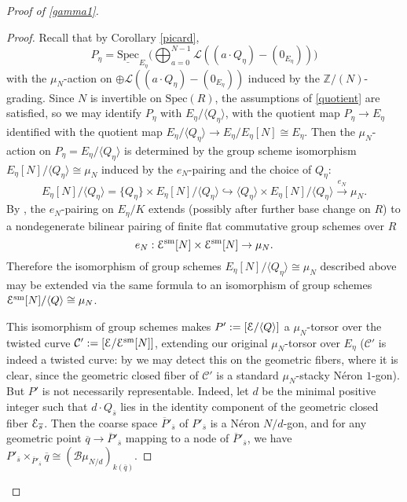 \documentclass[11pt]{amsart}
\theoremstyle{definition}
\begin{document}
\begin{proof}[Proof of \ref{gamma1}]
\begin{proof}
Recall that by Corollary \ref{picard}, 
\begin{displaymath}
P_\eta = \underline{\mathrm{Spec}}_{E_\eta} \big( \bigoplus_{a=0}^{N-1} {\mathcal{L}}((a\cdot Q_\eta) - (0_{E_\eta}))\big)
\end{displaymath}
with the $\mu_N$-action on $\oplus {\mathcal{L}}((a\cdot Q_\eta) - (0_{E_\eta}))$ induced by the $\mathbb{Z}/(N)$-grading. Since $N$ is invertible on $\mathrm{Spec}(R)$, the assumptions of \ref{quotient} are satisfied, so we may identify $P_\eta$ with $E_\eta/\langle Q_\eta \rangle$, with the quotient map $P_\eta \rightarrow E_\eta$ identified with the quotient map $E_\eta/\langle Q_\eta \rangle \rightarrow E_\eta/E_\eta[N] \cong E_\eta$. Then the $\mu_N$-action on $P_\eta = E_\eta/\langle Q_\eta \rangle$ is determined by the group scheme isomorphism $E_\eta[N]/\langle Q_\eta \rangle \cong \mu_N$ induced by the $e_N$-pairing and the choice of $Q_\eta$:
\begin{displaymath}
E_\eta[N]/\langle Q_\eta \rangle = \{Q_\eta\} \times E_\eta[N]/\langle Q_\eta \rangle \hookrightarrow \langle Q_\eta \rangle \times E_\eta[N]/\langle Q_\eta \rangle \stackrel{e_N}{\rightarrow} \mu_N.
\end{displaymath}
By \cite[Theorem 4.1.1]{C}, the $e_N$-pairing on $E_\eta/K$ extends (possibly after further base change on $R$) to a nondegenerate bilinear pairing of finite flat commutative group schemes over $R$ 
\begin{displaymath}
e_N: {\mathbf{\EuScript{E}}}^{\mathrm{sm}}[N] \times {\mathbf{\EuScript{E}}}^{\mathrm{sm}}[N] \rightarrow \mu_N.
\end{displaymath}
Therefore the isomorphism of group schemes $E_\eta[N]/\langle Q_\eta \rangle \cong \mu_N$ described above may be extended via the same formula to an isomorphism of group schemes ${\mathbf{\EuScript{E}}}^{\mathrm{sm}}[N]/\langle Q \rangle \cong \mu_N$.

This isomorphism of group schemes makes $P' := [{\mathbf{\EuScript{E}}}/\langle Q \rangle]$ a $\mu_N$-torsor over the twisted curve ${\mathcal{C}}':= [{\mathbf{\EuScript{E}}}/{\mathbf{\EuScript{E}}}^{\mathrm{sm}}[N]]$, extending our original $\mu_N$-torsor over $E_\eta$ (${\mathcal{C}}'$ is indeed a twisted curve: by \cite[Prop. 2.3]{AOV2} we may detect this on the geometric fibers, where it is clear, since the geometric closed fiber of ${\mathcal{C}}'$ is a standard $\mu_N$-stacky N\'eron $1$-gon). But $P'$ is not necessarily representable. Indeed, let $d$ be the minimal positive integer such that $d\cdot Q_{\overline{s}}$ lies in the identity component of the geometric closed fiber ${\mathbf{\EuScript{E}}}_{\overline{s}}$. Then the coarse space $\overline{P}'_{\overline{s}}$ of $P'_{\overline{s}}$ is a N\'eron $N/d$-gon, and for any geometric point $\overline{q} \rightarrow \overline{P}'_{\overline{s}}$ mapping to a node of $\overline{P}'_{\overline{s}}$, we have $P'_{\overline{s}}\times_{\overline{P}'_{\overline{s}}} \overline{q} \cong ({\mathcal{B}}\mu_{N/d})_{k(\overline{q})}$. 


\end{proof}
\end{proof}
\end{document}
